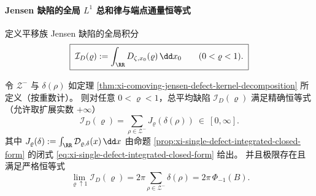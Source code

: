 \paragraph{Jensen 缺陷的全局 \texorpdfstring{$L^1$}{L1} 总和律与端点通量恒等式}
定义平移族 Jensen 缺陷的全局积分
\begin{equation}\label{eq:xi-integrated-defect-I}
\boxed{\;
\mathcal{I}_D(\varrho):=\int_{\RR}D_{\zeta,x_0}(\varrho)\,\dd x_0\qquad(0<\varrho<1).\;}
\end{equation}

\begin{theorem}\label{thm:xi-integrated-defect-sumrule-endpoint-flux}
 令 \(\mathcal{Z}^-\) 与 \(\delta(\rho)\) 如定理 \ref{thm:xi-comoving-jensen-defect-kernel-decomposition} 所定义（按重数计）。
 则对任意 \(0<\varrho<1\)，总平均缺陷 \(\mathcal{I}_D(\varrho)\) 满足精确恒等式（允许取扩展实数 \(+\infty\)）
\begin{equation}\label{eq:xi-integrated-defect-sumrule}
\boxed{\;
\mathcal{I}_D(\varrho)
=\sum_{\rho\in\mathcal{Z}^-}J_{\varrho}(\delta(\rho))\ \in\ [0,\infty].\;}
\end{equation}
其中 \(J_{\varrho}(\delta):=\int_{\RR}\mathcal{D}_{\varrho,\delta}(x)\,\dd x\) 由命题 \ref{prop:xi-single-defect-integrated-closed-form} 的闭式 \eqref{eq:xi-single-defect-integrated-closed-form} 给出。
并且极限存在且满足严格恒等式
\begin{equation}\label{eq:xi-integrated-defect-limit-endpoint-flux}
\boxed{\;
\lim_{\varrho\uparrow 1}\mathcal{I}_D(\varrho)
=2\pi\sum_{\rho\in\mathcal{Z}^-}\delta(\rho)
=2\pi\,\Phi_{-1}(B).\;}
\end{equation}
\end{theorem}

